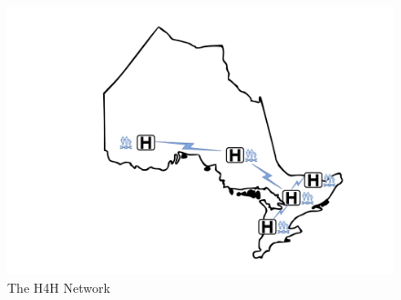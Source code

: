 \documentclass[twoside,symmetric,sfsidenotes,notoc]{tufte-book}
\begin{document}
\begin{figure}
  \includegraphics{H4HNetwork.pdf}
  \caption[The H4H Network]{The H4H Network}
  \label{fig:hpc4health_network}
\end{figure}




\backmatter





\printindex
\end{document}
